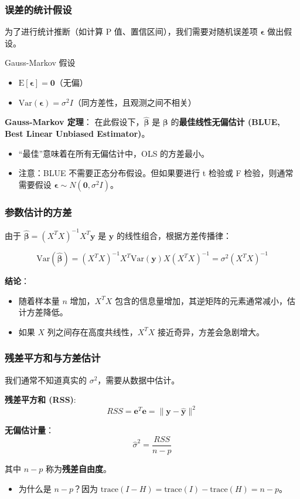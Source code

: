 \begin{frame}
\frametitle{误差的统计假设}

为了进行统计推断（如计算 P 值、置信区间），我们需要对随机误差项 $\boldsymbol{\epsilon}$ 做出假设。

\begin{block}{Gauss-Markov 假设}
\begin{itemize}
    \item $\mathrm{E}[\boldsymbol{\epsilon}] = \mathbf{0}$（无偏）
    \item $\mathrm{Var}(\boldsymbol{\epsilon}) = \sigma^2 I$（同方差性，且观测之间不相关）
\end{itemize}
\end{block}

\textbf{Gauss-Markov 定理}：
在此假设下，$\hat{\boldsymbol{\beta}}$ 是 $\boldsymbol{\beta}$ 的\textbf{最佳线性无偏估计 (BLUE, Best Linear Unbiased Estimator)}。
\begin{itemize}
    \item ``最佳''意味着在所有无偏估计中，OLS 的方差最小。
    \item 注意：BLUE 不需要正态分布假设。但如果要进行 t 检验或 F 检验，则通常需要假设 $\boldsymbol{\epsilon} \sim N(\mathbf{0}, \sigma^2 I)$。
\end{itemize}
\end{frame}


\begin{frame}
\frametitle{参数估计的方差}

由于 $\hat{\boldsymbol{\beta}} = (X^T X)^{-1} X^T \mathbf{y}$ 是 $\mathbf{y}$ 的线性组合，根据方差传播律：

\[
\mathrm{Var}(\hat{\boldsymbol{\beta}}) = (X^T X)^{-1} X^T \mathrm{Var}(\mathbf{y}) X (X^T X)^{-1} = \sigma^2 (X^T X)^{-1}
\]

\textbf{结论}：
\begin{itemize}
    \item 随着样本量 $n$ 增加，$X^T X$ 包含的信息量增加，其逆矩阵的元素通常减小，估计方差降低。
    \item 如果 $X$ 列之间存在高度共线性，$X^T X$ 接近奇异，方差会急剧增大。
\end{itemize}
\end{frame}


\begin{frame}
\frametitle{残差平方和与方差估计}

我们通常不知道真实的 $\sigma^2$，需要从数据中估计。

\textbf{残差平方和 (RSS)}:
\[
RSS = \mathbf{e}^T \mathbf{e} = \|\mathbf{y} - \hat{\mathbf{y}}\|^2
\]

\textbf{无偏估计量}：
\[
\hat{\sigma}^2 = \frac{RSS}{n - p}
\]

其中 $n-p$ 称为\textbf{残差自由度}。
\begin{itemize}
    \item 为什么是 $n-p$？因为 $\text{trace}(I-H) = \text{trace}(I) - \text{trace}(H) = n - p$。
\end{itemize}
\end{frame}

